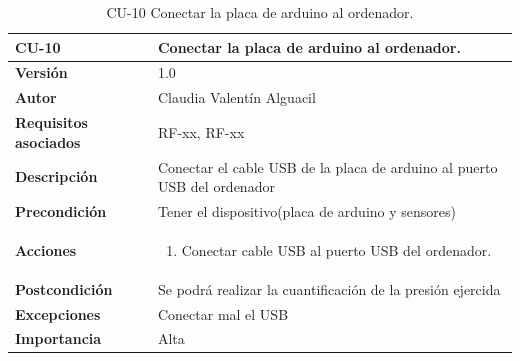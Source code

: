 \begin{table}[p]
	\centering
	\begin{tabularx}{\linewidth}{ p{} p{} }
		\toprule
		\textbf{CU-10}    & \textbf{Conectar la placa de arduino al ordenador.}\\
		\toprule
		\textbf{Versión}              & 1.0    \\
		\textbf{Autor}                & Claudia Valentín Alguacil \\
		\textbf{Requisitos asociados} & RF-xx, RF-xx \\
		\textbf{Descripción}          & Conectar el cable USB de la placa de arduino al puerto USB del ordenador \\
		\textbf{Precondición} & Tener el dispositivo(placa de arduino y sensores) \\
		\textbf{Acciones}             &
		\begin{enumerate}
			\def\labelenumi{\arabic{enumi}.}
			\tightlist
			\item Conectar cable USB al puerto USB del ordenador.
		\end{enumerate}\\
		\textbf{Postcondición}        &  Se podrá realizar la cuantificación de la presión ejercida \\
		\textbf{Excepciones}          & Conectar mal el USB \\
		\textbf{Importancia}          & Alta \\
		\bottomrule
	\end{tabularx}
	\caption{CU-10 Conectar la placa de arduino al ordenador.}
\end{table}

